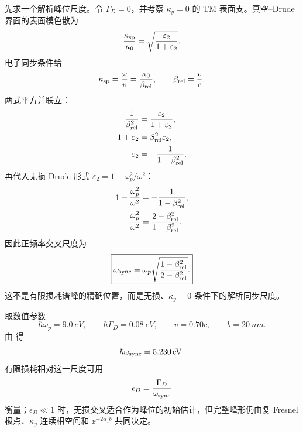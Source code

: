 \begin{exbox}
先求一个解析峰位尺度。令 $\Gamma_D=0$，并考察 $\kappa_y=0$ 的 TM 表面支。真空--Drude 界面的表面模色散为
\begin{equation*}
\frac{\kappa_{\rm sp}}{\kappa_0}
=\sqrt{\frac{\varepsilon_2}{1+\varepsilon_2}}.
\end{equation*}
电子同步条件给
\begin{equation*}
\kappa_{\rm sp}=\frac{\omega}{v}
=\frac{\kappa_0}{\beta_{\rm rel}},
\qquad
\beta_{\rm rel}=\frac vc.
\end{equation*}
两式平方并联立：
\begin{align*}
\frac1{\beta_{\rm rel}^2}
&=\frac{\varepsilon_2}{1+\varepsilon_2},\\
1+\varepsilon_2
&=\beta_{\rm rel}^2\varepsilon_2,\\
\varepsilon_2
&=-\frac1{1-\beta_{\rm rel}^2}.
\end{align*}
再代入无损 Drude 形式 $\varepsilon_2=1-\omega_p^2/\omega^2$：
\begin{align*}
1-\frac{\omega_p^2}{\omega^2}
&=-\frac1{1-\beta_{\rm rel}^2},\\
\frac{\omega_p^2}{\omega^2}
&=\frac{2-\beta_{\rm rel}^2}{1-\beta_{\rm rel}^2}.
\end{align*}
因此正频率交叉尺度为
\begin{equation}
\boxed{
\omega_{\rm sync}
=\omega_p
\sqrt{\frac{1-\beta_{\rm rel}^2}{2-\beta_{\rm rel}^2}}.}
\label{eq:drude_surface_pole_electron_sync_frequency}
\end{equation}
这不是有限损耗谱峰的精确位置，而是无损、$\kappa_y=0$ 条件下的解析同步尺度。

取数值参数
\begin{equation*}
\hbar\omega_p=\SI{9.0}{eV},
\qquad
\hbar\Gamma_D=\SI{0.08}{eV},
\qquad
v=0.70c,
\qquad
b=\SI{20}{nm}.
\end{equation*}
由 得
\begin{equation*}
\hbar\omega_{\rm sync}=\SI{5.230}{eV}.
\end{equation*}
有限损耗相对这一尺度可用
\begin{equation*}
\epsilon_D=\frac{\Gamma_D}{\omega_{\rm sync}}
\end{equation*}
衡量；$\epsilon_D\ll1$ 时，无损交叉适合作为峰位的初始估计，但完整峰形仍由复 Fresnel 极点、$\kappa_y$ 连续相空间和 $\ee^{-2\alpha_1b}$ 共同决定。


\end{exbox}
